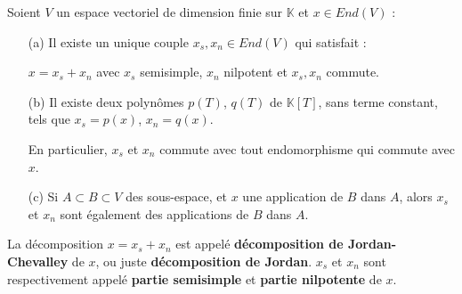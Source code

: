 \documentclass[a4paper,openany,12pt]{report}
\newcommand{\KK}{\mathbb{K}}
\theoremstyle{break}
{\theorembodyfont{\upshape}
\newtheorem*{rmq}{Remarque :}
\newtheorem*{prv}{Preuve :}
\newtheorem*{ex}{Exemples :}
\newtheorem*{exe}{Exemple : }
\newtheorem*{nota}{Notation :}
\newtheorem*{dem}{D\'emonstration :}}
\begin{document}
\begin{prop}\label{prop:C1}
\quad Soient $V$ un espace vectoriel de dimension finie sur $\KK$ et $x \in End(V)$ :
\begin{itemize}
\item[(a)] Il existe un unique couple $x_{s},x_{n} \in End(V)$ qui satisfait :
\begin{center}
$x=x_{s}+x_{n}$ avec $x_{s}$ semisimple, $x_{n}$ nilpotent et $x_{s},x_{n}$ commute.
\end{center}

\item[(b)] Il existe deux polynômes $p(T)$, $q(T)$ de $\KK[T]$, sans terme constant, tels que $x_{s}=p(x)$, $x_{n} = q(x)$. 

En particulier, $x_{s}$ et $x_{n}$ commute avec tout endomorphisme qui commute avec $x$.

\item[(c)] Si $A \subset B \subset V$ des sous-espace, et $x$ une application de $B$ dans $A$, alors $x_{s}$ et $x_{n}$ sont également des applications de $B$ dans $A$. 
\end{itemize}
\end{prop}

\begin{df}
\quad La décomposition $x = x_{s}+x_{n}$ est appelé \textbf{décomposition de Jordan-Chevalley} de $x$, ou juste \textbf{décomposition de Jordan}. $x_{s}$ et $x_{n}$ sont respectivement appelé \textbf{partie semisimple} et \textbf{partie nilpotente} de $x$.
\end{df}
\end{document}

